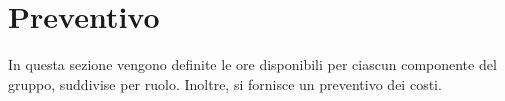\section{Preventivo}
In questa sezione vengono definite le ore disponibili per ciascun componente del gruppo, suddivise per ruolo. Inoltre, si fornisce un preventivo dei costi.

